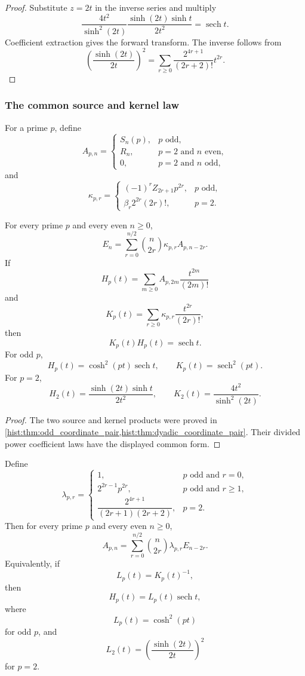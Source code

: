 \begin{proof}
Substitute \(z=2t\) in the inverse series and multiply
\[
\frac{4t^2}{\sinh^2(2t)}
\frac{\sinh(2t)\sinh t}{2t^2}
=
\operatorname{sech}t.
\]
Coefficient extraction gives the forward transform. The inverse follows from
\[
\left(\frac{\sinh(2t)}{2t}\right)^2
=
\sum_{r\geq0}
\frac{2^{4r+1}}{(2r+2)!}t^{2r}.
\]
\end{proof}

\subsubsection{The common source and kernel law}

For a prime \(p\), define
\[
A_{p,n}
=
\begin{cases}
S_n(p),&p\text{ odd},\\
R_n,&p=2\text{ and }n\text{ even},\\
0,&p=2\text{ and }n\text{ odd},
\end{cases}
\]
and
\[
\kappa_{p,r}
=
\begin{cases}
(-1)^rZ_{2r+1}p^{2r},&p\text{ odd},\\
\beta_r2^{2r}(2r)!,&p=2.
\end{cases}
\]

\begin{histtheorem}\label{hist:thm:unified_local_euler}
For every prime \(p\) and every even \(n\geq0\),
\[
\boxed{
E_n
=
\sum_{r=0}^{n/2}
\binom n{2r}
\kappa_{p,r}
A_{p,n-2r}.
}
\]
If
\[
H_p(t)
=
\sum_{m\geq0}A_{p,2m}\frac{t^{2m}}{(2m)!}
\]
and
\[
K_p(t)
=
\sum_{r\geq0}\kappa_{p,r}\frac{t^{2r}}{(2r)!},
\]
then
\[
\boxed{K_p(t)H_p(t)=\operatorname{sech}t.}
\]
For odd \(p\),
\[
H_p(t)=\cosh^2(pt)\operatorname{sech}t,
\qquad
K_p(t)=\operatorname{sech}^2(pt).
\]
For \(p=2\),
\[
H_2(t)=\frac{\sinh(2t)\sinh t}{2t^2},
\qquad
K_2(t)=\frac{4t^2}{\sinh^2(2t)}.
\]
\end{histtheorem}

\begin{proof}
The two source and kernel products were proved in \cref{hist:thm:odd_coordinate_pair,hist:thm:dyadic_coordinate_pair}. Their divided power coefficient laws have the displayed common form.
\end{proof}

\begin{histtheorem}\label{hist:thm:unified_inverse_local_euler}
Define
\[
\lambda_{p,r}
=
\begin{cases}
1,&p\text{ odd and }r=0,\\
2^{2r-1}p^{2r},&p\text{ odd and }r\geq1,\\
\dfrac{2^{4r+1}}{(2r+1)(2r+2)},&p=2.
\end{cases}
\]
Then for every prime \(p\) and every even \(n\geq0\),
\[
\boxed{
A_{p,n}
=
\sum_{r=0}^{n/2}
\binom n{2r}
\lambda_{p,r}
E_{n-2r}.
}
\]
Equivalently, if
\[
L_p(t)=K_p(t)^{-1},
\]
then
\[
\boxed{H_p(t)=L_p(t)\operatorname{sech}t,}
\]
where
\[
L_p(t)=\cosh^2(pt)
\]
for odd \(p\), and
\[
L_2(t)=\left(\frac{\sinh(2t)}{2t}\right)^2
\]
for \(p=2\).
\end{histtheorem}

